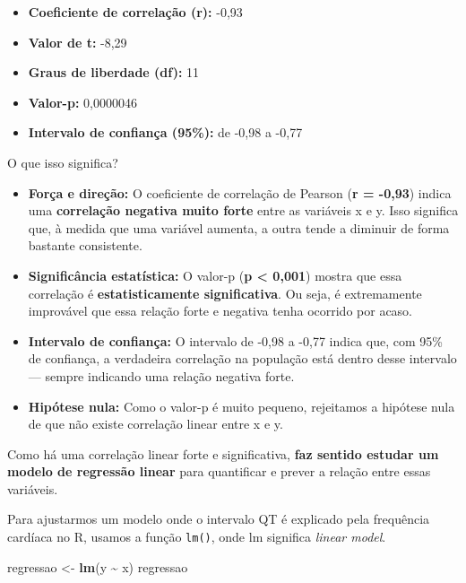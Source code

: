 \documentclass[
]{book}
\newenvironment{Shaded}{\begin{snugshade}}{\end{snugshade}}
\newcommand{\FunctionTok}[1]{\textcolor[rgb]{0.13,0.29,0.53}{\textbf{#1}}}
\newcommand{\NormalTok}[1]{#1}
\newcommand{\OtherTok}[1]{\textcolor[rgb]{0.56,0.35,0.01}{#1}}
\newcommand{\SpecialCharTok}[1]{\textcolor[rgb]{0.81,0.36,0.00}{\textbf{#1}}}
\providecommand{\tightlist}{%
  \setlength{\itemsep}{0pt}\setlength{\parskip}{0pt}}
\begin{document}
\begin{itemize}
\tightlist
\item
  \textbf{Coeficiente de correlação (r):} -0,93
\item
  \textbf{Valor de t:} -8,29
\item
  \textbf{Graus de liberdade (df):} 11
\item
  \textbf{Valor-p:} 0,0000046
\item
  \textbf{Intervalo de confiança (95\%):} de -0,98 a -0,77
\end{itemize}

O que isso significa?

\begin{itemize}
\tightlist
\item
  \textbf{Força e direção:} O coeficiente de correlação de Pearson (\textbf{r = -0,93}) indica uma \textbf{correlação negativa muito forte} entre as variáveis x e y. Isso significa que, à medida que uma variável aumenta, a outra tende a diminuir de forma bastante consistente.
\item
  \textbf{Significância estatística:} O valor-p (\textbf{p \textless{} 0,001}) mostra que essa correlação é \textbf{estatisticamente significativa}. Ou seja, é extremamente improvável que essa relação forte e negativa tenha ocorrido por acaso.
\item
  \textbf{Intervalo de confiança:} O intervalo de -0,98 a -0,77 indica que, com 95\% de confiança, a verdadeira correlação na população está dentro desse intervalo --- sempre indicando uma relação negativa forte.
\item
  \textbf{Hipótese nula:} Como o valor-p é muito pequeno, rejeitamos a hipótese nula de que não existe correlação linear entre x e y.
\end{itemize}

Como há uma correlação linear forte e significativa, \textbf{faz sentido estudar um modelo de regressão linear} para quantificar e prever a relação entre essas variáveis.

Para ajustarmos um modelo onde o intervalo QT é explicado pela frequência cardíaca no R, usamos a função \texttt{lm()}, onde lm significa \emph{linear model}.

\begin{Shaded}
\begin{Highlighting}[]
\NormalTok{regressao }\OtherTok{\textless{}{-}} \FunctionTok{lm}\NormalTok{(y }\SpecialCharTok{\textasciitilde{}}\NormalTok{ x)}
\NormalTok{regressao}
\end{Highlighting}
\end{Shaded}
\end{document}
